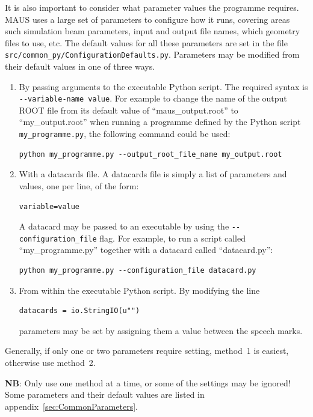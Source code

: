 \documentclass[a4paper,10pt]{article}
\begin{document}
    It is also important to consider what parameter values the programme requires.  MAUS uses a large set of parameters to configure how it runs, covering areas such simulation beam parameters, input and output file names, which geometry files to use, etc.  The default values for all these parameters are set in the file \texttt{src/common\_py/ConfigurationDefaults.py}. Parameters may be modified from their default values in one of three ways. 
    
    \begin{enumerate}
     \item By passing arguments to the executable Python script.  The required syntax is \texttt{-{}-variable-name value}. For example to change the name of the output ROOT file from its default value of ``maus\_output.root'' to ``my\_output.root'' when running a programme defined by the Python script \texttt{my\_programme.py}, the following command could be used:
     \begin{lstlisting}
python my_programme.py --output_root_file_name my_output.root
    \end{lstlisting}
    \item With a datacards file. A datacards file is simply a list of parameters and values, one per line, of the form:
    \begin{lstlisting}
variable=value
    \end{lstlisting}
    A datacard may be passed to an executable by using the \texttt{-{}-configuration\_file} flag. For example, to run a script called ``my\_programme.py'' together with a datacard called ``datacard.py'':
    \begin{lstlisting}
python my_programme.py --configuration_file datacard.py
    \end{lstlisting}
    \item From within the executable Python script. By modifying the line
    \begin{lstlisting}
datacards = io.StringIO(u"")
    \end{lstlisting}
    parameters may be set by assigning them a value between the speech marks.
    \end{enumerate}
    Generally, if only one or two parameters require setting, method~1 is easiest, otherwise use method~2. 

    \textbf{NB}: Only use one method at a time, or some of the settings may be ignored! Some parameters and their default values are listed in appendix~\ref{sec:CommonParameters}.
\end{document}
